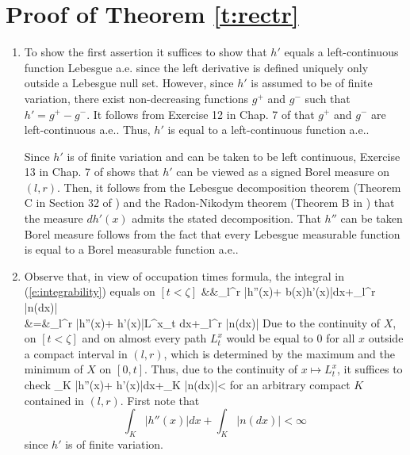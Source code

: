 \documentclass[11pt,reqno]{amsart}
\numberwithin{equation}{section}
\begin{document}
\section{Proof of Theorem \ref{t:rectr}}
\begin{enumerate}[leftmargin=*]
		\item To show the first assertion it suffices to show that $h'$ equals a left-continuous function Lebesgue a.e. since the left derivative is  defined uniquely only outside  a Lebesgue null set. However, since $h'$ is assumed to be of finite variation, there exist non-decreasing functions $g^{+}$ and $g^{-}$ such that $h'=g^+ -g^-$. It follows from Exercise 12 in Chap. 7 of \cite{Rudin} that $g^+$ and $g^-$ are left-continuous a.e.. Thus, $h'$ is equal to a left-continuous function a.e..  
		
		Since $h'$ is of finite variation and can be taken to be left continuous, Exercise 13 in Chap. 7 of \cite{Rudin} shows that $h'$ can be viewed as a signed Borel measure on $(l,r)$. Then, it follows  from the Lebesgue decomposition theorem (Theorem C in Section 32 of \cite{Halmos}) and the Radon-Nikodym theorem (Theorem B in \cite{Halmos}) that the measure $dh'(x)$ admits the stated decomposition. That  $h''$ can be taken Borel measure follows from the fact that every Lebesgue measurable function is equal to a Borel measurable function a.e..
		
		\item Observe that, in view of occupation times formula, the integral in (\ref{e:integrability})  equals on $[t<\zeta]$
		\bean
		&&\int_l^r \left|h''(x)+ b(x)h'(x)\right|dx+\int_l^r 	|n(dx)|\\
		&=&\int_l^r \left|\half h''(x)+ h'(x)\right|L^x_{t }dx+\int_l^r 	|n(dx)|
		\eean
		Due to the continuity of $X$, on $[t<\zeta]$ and on almost every path $L^x_t$ would be equal to $0$ for all $x$ outside a compact interval in $(l,r)$, which is determined by the maximum and the minimum of $X$ on $[0,t]$. Thus, due to the continuity of $x \mapsto L^x_t$, it suffices to check 
		\be \label{e:MFv}
		\int_K \left|\half h''(x)+ h'(x)\right|dx+\int_K |n(dx)|<\infty
		\ee
		for an arbitrary compact $K$ contained in $(l,r)$. First note that
		\[
		\int_K \left|h''(x)\right|dx + \int_K |n(dx)|<\infty
		\]
		since $h'$ is of finite variation. 
		

\end{enumerate}
\end{document}
